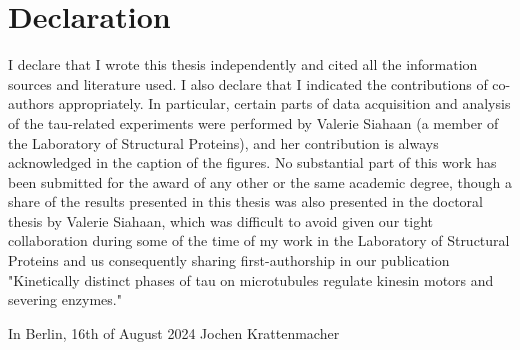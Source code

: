 \chapter*{Declaration}
I declare that I wrote this thesis independently and cited all the information sources and literature used. I also declare that I indicated the contributions of co-authors appropriately. In particular, certain parts of data acquisition and analysis of the tau-related experiments were performed by Valerie Siahaan (a member of the Laboratory of Structural Proteins), and her contribution is always acknowledged in the caption of the figures. No substantial part of this work has been submitted for the award of any other or the same academic degree, though a share of the results presented in this thesis was also presented in the doctoral thesis by Valerie Siahaan, which was difficult to avoid given our tight collaboration during some of the time of my work in the Laboratory of Structural Proteins and us consequently sharing first-authorship in our publication "Kinetically distinct phases of tau on microtubules regulate kinesin motors and severing enzymes."\\

\begin{minipage}{5in}
    \vspace{0.5in}
    In Berlin, 16th of August 2024 \hfill Jochen Krattenmacher
\end{minipage}